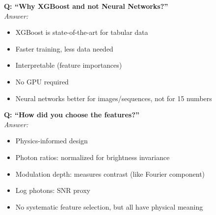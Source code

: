 \documentclass[a4paper,10pt]{article}
\begin{document}
\begin{mdframed}[style=warnung]
\textbf{Q: ``Why XGBoost and not Neural Networks?''}\\[5pt]
\textit{Answer:}
\begin{itemize}[leftmargin=*, nosep]
    \item XGBoost is state-of-the-art for tabular data
    \item Faster training, less data needed
    \item Interpretable (feature importances)
    \item No GPU required
    \item Neural networks better for images/sequences, not for 15 numbers
\end{itemize}
\end{mdframed}

\begin{mdframed}[style=warnung]
\textbf{Q: ``How did you choose the features?''}\\[5pt]
\textit{Answer:}
\begin{itemize}[leftmargin=*, nosep]
    \item Physics-informed design
    \item Photon ratios: normalized for brightness invariance
    \item Modulation depth: measures contrast (like Fourier component)
    \item Log photons: SNR proxy
    \item No systematic feature selection, but all have physical meaning
\end{itemize}
\end{mdframed}

\vspace{1cm}

\begin{center}
\end{center}
\end{document}
